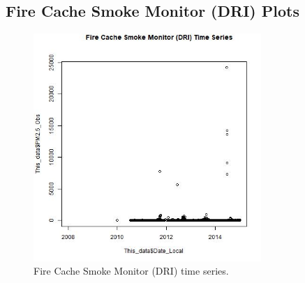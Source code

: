 
\subsection*{Fire Cache Smoke Monitor (DRI) Plots}
\begin{figure} 
\centering 
\includegraphics[width=0.77\textwidth]{Code_Outputs/FireCacheDRI_time_series.jpg} 
\caption{\label{fig:FireCacheDRITS}Fire Cache Smoke Monitor (DRI) time series.} 
\end{figure} 
 
